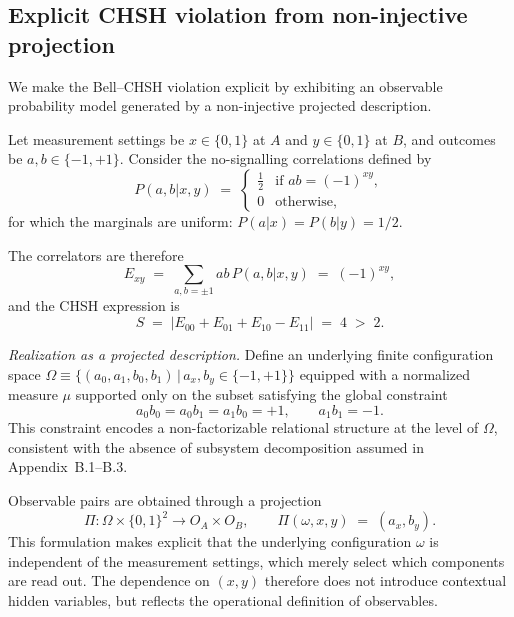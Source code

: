 \subsection{Explicit CHSH violation from non-injective projection}
  \label{subsec:explicit-chsh-violation-from-non-injective-projection}

  We make the Bell--CHSH violation explicit by exhibiting an observable probability
  model generated by a non-injective projected description.

  Let measurement settings be $x\in\{0,1\}$ at $A$ and $y\in\{0,1\}$ at $B$,
  and outcomes be $a,b\in\{-1,+1\}$.
  Consider the no-signalling correlations defined by
  \begin{equation}
    P(a,b|x,y)
    \;=\;
    \begin{cases}
      \tfrac12 & \text{if } ab = (-1)^{xy},\\
      0 & \text{otherwise,}
    \end{cases}
    \label{eq:prbox_distribution}
  \end{equation}
  for which the marginals are uniform: $P(a|x)=P(b|y)=1/2$.

  The correlators are therefore
  \begin{equation}
    E_{xy} \;=\; \sum_{a,b=\pm 1} ab\,P(a,b|x,y) \;=\; (-1)^{xy},
    \label{eq:prbox_correlators}
  \end{equation}
  and the CHSH expression is
  \begin{equation}
    S \;=\; \bigl|E_{00}+E_{01}+E_{10}-E_{11}\bigr|
    \;=\; 4 \;>\; 2.
    \label{eq:chsh_violation}
  \end{equation}

  \medskip
  \noindent
  \textit{Realization as a projected description.}
  Define an underlying finite configuration space
  $\Omega \equiv \{(a_0,a_1,b_0,b_1)\,|\,a_x,b_y\in\{-1,+1\}\}$ equipped with a
  normalized measure $\mu$ supported only on the subset satisfying the global
  constraint
  \begin{equation}
    a_0 b_0 = a_0 b_1 = a_1 b_0 = +1, \qquad a_1 b_1 = -1.
    \label{eq:global_constraint}
  \end{equation}
  This constraint encodes a non-factorizable relational structure at the level of
  $\Omega$, consistent with the absence of subsystem decomposition assumed in
  Appendix~B.1--B.3.

  Observable pairs are obtained through a projection
  \begin{equation}
    \Pi:\Omega \times \{0,1\}^2 \to O_A\times O_B,\qquad
    \Pi(\omega,x,y) \;=\; (a_x,b_y).
    \label{eq:contextual_projection}
  \end{equation}
  This formulation makes explicit that the underlying configuration $\omega$ is
  independent of the measurement settings, which merely select which components are
  read out.
  The dependence on $(x,y)$ therefore does not introduce contextual hidden variables,
  but reflects the operational definition of observables.

